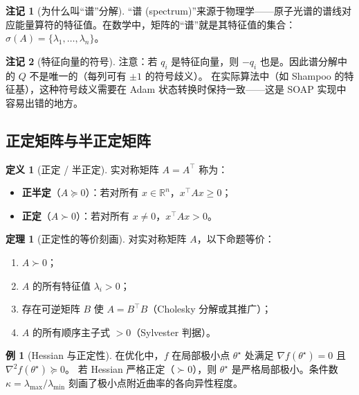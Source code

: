 \documentclass[12pt,a4paper]{ctexart}
\theoremstyle{definition}
\newtheorem{definition}{定义}[section]
\newtheorem{theorem}{定理}[section]
\newtheorem{remark}{注记}[section]
\newtheorem{example}{例}[section]
\theoremstyle{plain}
\newcommand{\R}{\mathbb{R}}
\newcommand{\grad}{\nabla}
\begin{document}
\begin{remark}[为什么叫“谱”分解]
  “谱 (spectrum)”来源于物理学——原子光谱的谱线对应能量算符的特征值。在数学中，矩阵的“谱”就是其特征值的集合：
  $\sigma(A)=\{\lambda_1,\ldots,\lambda_n\}$。
\end{remark}

\begin{remark}[特征向量的符号]
  注意：若 $q_i$ 是特征向量，则 $-q_i$ 也是。因此谱分解中的 $Q$ 不是唯一的（每列可有 $\pm 1$ 的符号歧义）。
  在实际算法中（如 Shampoo 的特征基），这种符号歧义需要在 Adam 状态转换时保持一致——这是 SOAP 实现中容易出错的地方。
\end{remark}

\subsection{正定矩阵与半正定矩阵}

\begin{definition}[正定 / 半正定]
  实对称矩阵 $A=A^\top$ 称为：
  \begin{itemize}
    \item \textbf{正半定}（$A\succeq0$）：若对所有 $x\in\R^n$，$x^\top A x\ge0$；
    \item \textbf{正定}（$A\succ0$）：若对所有 $x\neq0$，$x^\top A x>0$。
  \end{itemize}
\end{definition}

\begin{theorem}[正定性的等价刻画]
  对实对称矩阵 $A$，以下命题等价：
  \begin{enumerate}[label=(\roman*)]
    \item $A\succ0$；
    \item $A$ 的所有特征值 $\lambda_i>0$；
    \item 存在可逆矩阵 $B$ 使 $A=B^\top B$（Cholesky 分解或其推广）；
    \item $A$ 的所有顺序主子式 $>0$（Sylvester 判据）。
  \end{enumerate}
\end{theorem}

\begin{example}[Hessian 与正定性]
  在优化中，$f$ 在局部极小点 $\theta^\star$ 处满足 $\grad f(\theta^\star)=0$ 且 $\grad^2 f(\theta^\star)\succeq0$。
  若 Hessian 严格正定（$\succ0$），则 $\theta^\star$ 是严格局部极小。条件数 $\kappa=\lambda_{\max}/\lambda_{\min}$ 刻画了极小点附近曲率的各向异性程度。
\end{example}
\end{document}
